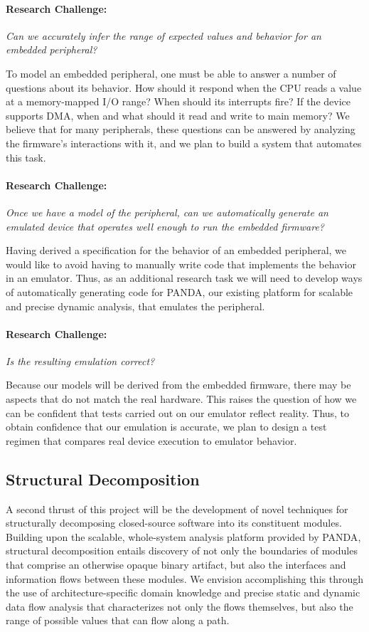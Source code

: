 \documentclass[letterpaper,twoside,11pt,headings=small]{scrartcl}
\newcommand{\dynamicsys}{\textsc{PANDA}\xspace}
\newcommand{\challenge}[1]{\paragraph{Research Challenge:} \emph{#1}}
\begin{document}
\challenge{Can we accurately infer the range of expected values and
behavior for an embedded peripheral?}

To model an embedded peripheral, one must be able to answer a number of
questions about its behavior. How should it respond when the CPU reads a value
at a memory-mapped I/O range? When should its interrupts fire? If the device
supports DMA, when and what should it read and write to main memory? We
believe that for many peripherals, these questions can be answered by
analyzing the firmware's interactions with it, and we plan to build a system
that automates this task.

\challenge{Once we have a model of the peripheral, can we automatically
generate an emulated device that operates well enough to run the embedded firmware?}

Having derived a specification for the behavior of an embedded peripheral, we
would like to avoid having to manually write code that implements the behavior
in an emulator. Thus, as an additional research task we will need to develop
ways of automatically generating code for \dynamicsys, our existing platform
for scalable and precise dynamic analysis, that emulates the peripheral.

\challenge{Is the resulting emulation correct?}

Because our models will be derived from the embedded firmware, there may be
aspects that do not match the real hardware. This raises the question of how
we can be confident that tests carried out on our emulator reflect reality.
Thus, to obtain confidence that our emulation is accurate, we plan to design a
test regimen that compares real device execution to emulator behavior.

\subsection{Structural Decomposition}
\label{sec:overview:structure}

A second thrust of this project will be the development of novel techniques
for structurally decomposing closed-source software into its constituent
modules.  Building upon the scalable, whole-system analysis platform provided
by \dynamicsys, structural decomposition entails discovery of not only the
boundaries of modules that comprise an otherwise opaque binary artifact, but
also the interfaces and information flows between these modules.  We envision
accomplishing this through the use of architecture-specific domain knowledge
and precise static and dynamic data flow analysis that characterizes not only
the flows themselves, but also the range of possible values that can flow along
a path.
\end{document}
